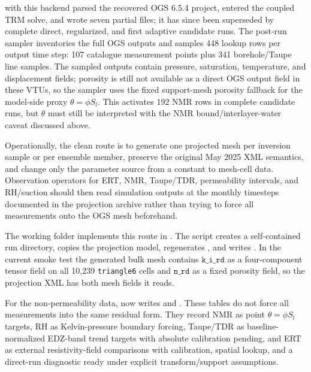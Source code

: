 with this backend parsed the recovered OGS 6.5.4 project, entered the coupled TRM
solve, and wrote seven partial  files; it has since been superseded by
complete direct, regularized, and first adaptive candidate runs.  The post-run
sampler  inventories the
full OGS outputs and samples 448 lookup rows per output time step: 107 catalogue
measurement points plus 341 borehole/Taupe line samples.  The sampled outputs contain
pressure, saturation, temperature, and displacement fields; porosity is still not
available as a direct OGS output field in these VTUs, so the sampler uses the fixed
support-mesh  porosity fallback for the model-side proxy
\(\theta=\phi S_l\).  This activates 192 NMR rows in complete candidate runs, but
\(\theta\) must still be interpreted with the NMR bound/interlayer-water caveat
discussed above.

Operationally, the clean route is to generate one projected mesh per inversion sample
or per ensemble member, preserve the original May 2025 XML semantics, and change only
the parameter source from a constant to mesh-cell data.  Observation operators for ERT,
NMR, Taupe/TDR, permeability intervals, and RH/suction should then read simulation
outputs at the monthly timesteps documented in the projection archive rather than
trying to force all measurements onto the OGS mesh beforehand.

The working folder implements this route in
.  The script creates a
self-contained run directory, copies the projection model, regenerates
, and writes .  In the current
smoke test the generated bulk mesh contains \(\texttt{k\_i\_rd}\) as a four-component
tensor field on all 10,239 \texttt{triangle6} cells and \(\texttt{n\_rd}\) as a fixed
porosity field, so the projection XML has both mesh fields it reads.

For the non-permeability data,  now writes
 and .  These
tables do not force all measurements into the same residual form.  They record NMR as
point \(\theta=\phi S_l\) targets, RH as Kelvin-pressure boundary forcing, Taupe/TDR as
baseline-normalized EDZ-band trend targets with absolute calibration pending, and ERT
as external resistivity-field comparisons with calibration, spatial lookup, and a
direct-run diagnostic ready under explicit transform/support assumptions.

